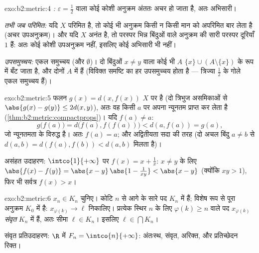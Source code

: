 \begin{solution}{exo:b2:metric:4}
\emph{:} $\varepsilon = \frac12$ वाला कोई कोशी अनुक्रम अंततः अचर हो जाता है, अतः
अभिसारी।

\emph{ तभी जब परिमित:} यदि $X$ परिमित है, तो कोई भी अनुक्रम किसी न
किसी मान को अपरिमित बार लेता है (अचर उपअनुक्रम)। और यदि $X$ अनंत है, तो
परस्पर भिन्न बिंदुओं वाले अनुक्रम की सारी परस्पर दूरियाँ $1$ हैं: अतः
कोई कोशी उपअनुक्रम नहीं, इसलिए कोई अभिसारी भी नहीं।

\emph{ उपसमुच्चय:} एकल समुच्चय (और $\emptyset$)। दो बिंदुओं $x \neq y$ वाला कोई
भी $A$ $\{x\} \cup (A
\setminus\{x\})$ के रूप में बँट जाता है, और दोनों $A$ में  हैं (विविक्त
समष्टि का हर उपसमुच्चय  होता है --- त्रिज्या $\frac12$ के गोले एकल
समुच्चय हैं)।
\end{solution}

\begin{solution}{exo:b2:metric:5}
फलन $g(x) = d(x, f(x))$  $X$ पर  है (दो त्रिभुज असमिकाओं से $\abs{g(x) - g(y)} \leq 2d(x,y)$), अतः वह किसी
$a$ पर अपना न्यूनतम प्राप्त कर लेता है (\cref{thm:b2:metric:compactprops})। यदि $f(a) \neq a$:
\[
g\bigl(f(a)\bigr) = d\bigl(f(a), f(f(a))\bigr) < d(a, f(a)) = g(a),
\]
जो न्यूनतमता के विरुद्ध है। अतः $f(a) = a$; और अद्वितीयता सदा की तरह (दो अचल
बिंदु $a \neq b$ से $d(a,b) = d(f(a), f(b)) < d(a,b)$ मिलता है)।

असंहत उदाहरण: $\intco{1}{+\infty}$ पर $f(x) = x + \frac1x$: $x \neq y$ के लिए $\abs{f(x) - f(y)} = \abs{x - y}\,\abs{1 - \frac{1}{xy}} < \abs{x -
y}$ (क्योंकि $xy > 1$), फिर भी सर्वत्र
$f(x) > x$।
\end{solution}

\begin{solution}{exo:b2:metric:6}
$x_n \in K_n$ चुनिए। कोटि $n$ से आगे के सारे पद $K_n$ में हैं; विशेष रूप से पूरा
अनुक्रम  $K_0$ में है: $x_{\varphi(k)} \to \ell$ निकालिए। प्रत्येक स्थिर $n$ के लिए $\varphi(k) \geq n$
वाले पद $x_{\varphi(k)}$ \emph{संवृत} $K_n$ में हैं, अतः सीमा $\ell \in K_n$। इसलिए $\ell \in \bigcap K_n$।

संवृत प्रतिउदाहरण: $\R$ में $F_n = \intco{n}{+\infty}$: अंतःस्थ, संवृत, अरिक्त, और प्रतिच्छेदन
रिक्त।
\end{solution}

